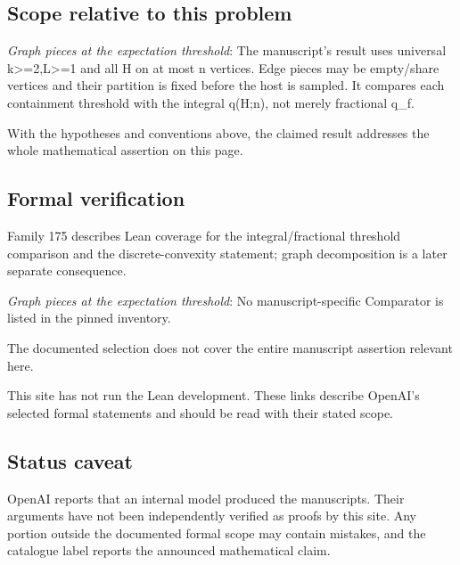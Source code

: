 \documentclass[11pt]{article}
\begin{document}
\subsection{Scope relative to this problem}
\textit{Graph pieces at the expectation threshold}: The manuscript’s result uses universal k>=2,L>=1 and all H on at most n vertices. Edge pieces may be empty/share vertices and their partition is fixed before the host is sampled. It compares each containment threshold with the integral q(H;n), not merely fractional q\_f.

With the hypotheses and conventions above, the claimed result addresses the whole mathematical assertion on this page.

\subsection{Formal verification}
Family 175 describes Lean coverage for the integral/fractional threshold comparison and the discrete-convexity statement; graph decomposition is a later separate consequence.

\textit{Graph pieces at the expectation threshold}: No manuscript-specific Comparator is listed in the pinned inventory.

The documented selection does not cover the entire manuscript assertion relevant here.

This site has not run the Lean development. These links describe OpenAI’s selected formal statements and should be read with their stated scope.

\subsection{Status caveat}
OpenAI reports that an internal model produced the manuscripts. Their arguments have not been independently verified as proofs by this site. Any portion outside the documented formal scope may contain mistakes, and the catalogue label reports the announced mathematical claim.
\end{document}
